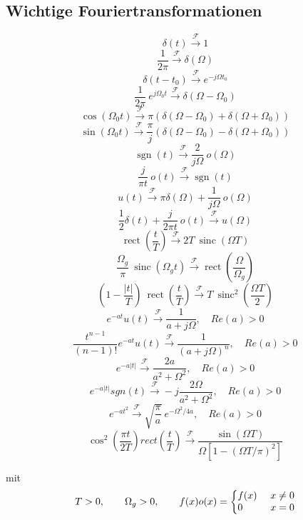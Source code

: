 \documentclass[10pt,a4paper]{article}
\newcommand{\ftransform}{
	\xrightarrow{~\mathcal{F}~}
}
\DeclareMathOperator{\sinc}{sinc}
\DeclareMathOperator{\sgn}{sgn}
\DeclareMathOperator{\rect}{rect}
\begin{document}
\subsection*{Wichtige Fouriertransformationen}
\begin{multicols}{2}
\small
\[ \delta(t) \ftransform 1 \]
\[ \frac{1}{2 \pi} \ftransform \delta(\Omega) \]
\[ \delta(t - t_0) \ftransform e^{-j\Omega t_0} \]
\[ \frac{1}{2 \pi} ~ e^{j \Omega_0 t} \ftransform \delta(\Omega - \Omega_0) \]
\[ \cos(\Omega_0 t) \ftransform \pi \left( \delta(\Omega - \Omega_0) + \delta(\Omega + \Omega_0) \right) \]
\[ \sin(\Omega_0 t) \ftransform \frac{\pi}{j} \left( \delta(\Omega - \Omega_0) - \delta(\Omega + \Omega_0) \right) \]
\[ \sgn(t) \ftransform \frac{2}{j \Omega} ~ o(\Omega) \]
\[ \frac{j}{\pi t} ~ o(t) \ftransform \sgn(t) \]
\[ u(t) \ftransform \pi \delta(\Omega) + \frac{1}{j \Omega} ~ o(\Omega) \]
\[ \frac{1}{2} \delta(t) + \frac{j}{2 \pi t} ~ o(t) \ftransform u(\Omega) \]
\[ \rect \left(\frac{t}{T} \right) \ftransform 2 T ~ \sinc(\Omega T) \]
\[ \frac{\Omega_g}{\pi} ~ \sinc(\Omega_g t) \ftransform \rect \left( \frac{\Omega}{\Omega_g} \right) \]
\[ \left(1 - \frac{|t|}{T} \right) ~ \rect \left(\frac{t}{T} \right) \ftransform T ~ \sinc^2 \left( \frac{\Omega T}{2} \right) \]
\[ e^{-at}u(t) \ftransform \frac{1}{a+j\Omega},\quad Re(a)>0 \]
\[ \frac{t^{n-1}}{(n-1)!}e^{-at}u(t) \ftransform \frac{1}{(a+j\Omega)^n},\quad Re(a)>0 \]
\[ e^{-a\lvert t \rvert} \ftransform \frac{2a}{a^2+\Omega^2},\quad Re(a)>0\]
\[ e^{-a\lvert t \rvert}sgn(t) \ftransform -j\frac{2\Omega}{a^2+\Omega^2},\quad Re(a)>0 \]
\[ e^{-at^2} \ftransform \sqrt{\frac{\pi}{a}}~e^{-\Omega^2/4a},\quad Re(a)>0 \]
\[ \cos^2(\frac{\pi t}{2T})rect(\frac{t}{T}) \ftransform \frac{\sin(\Omega T)}{\Omega[1-(\Omega T/\pi)^2]} \]
\end{multicols}
mit 
\[ T>0, \qquad\Omega_g>0, \qquad f(x)o(x)=\left\{\begin{array}{@{}ll@{}}
f(x) ~ &x\neq0\\ 0 ~ &x=0
\end{array}\right. \]
\end{document}
